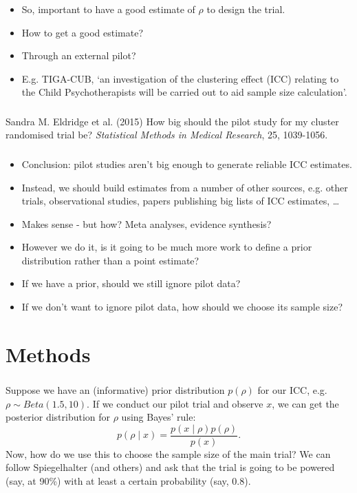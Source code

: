 \documentclass{beamer}
\begin{document}
\begin{frame}
\frametitle{}
\begin{itemize}
\item So, important to have a good estimate of $\rho$ to design the trial.
\item How to get a good estimate?
\item Through an external pilot?
\item E.g. TIGA-CUB, `an investigation of the clustering effect (ICC) relating to the Child Psychotherapists will be carried out to aid sample size calculation'.
\end{itemize}
\end{frame}

\begin{frame}
\frametitle{}
\begin{thebibliography}{99}
 Sandra M. Eldridge et al. (2015) 
\newblock How big should the pilot study for my cluster randomised trial be?
\newblock \emph{Statistical Methods in Medical Research}, 25, 1039-1056.
\end{thebibliography}
\end{frame}

\begin{frame}
\frametitle{}
\begin{itemize}
\item Conclusion: pilot studies aren't big enough to generate reliable ICC estimates.
\item Instead, we should build estimates from a number of other sources, e.g. other trials, observational studies, papers publishing big lists of ICC estimates, \ldots
\item Makes sense - but how? Meta analyses, evidence synthesis?
\item However we do it, is it going to be much more work to define a prior distribution rather than a point estimate?
\item If we have a prior, should we still ignore pilot data?
\item If we don't want to ignore pilot data, how should we choose its sample size?
\end{itemize}
\end{frame}

\section{Methods}

\begin{frame}
\frametitle{}
Suppose we have an (informative) prior distribution $p(\rho)$ for our ICC, e.g. $\rho \sim Beta(1.5, 10)$. 
\pause
If we conduct our pilot trial and observe $x$, we can get the posterior distribution for $\rho$ using Bayes' rule:
\begin{equation}
p(\rho \mid x) = \frac{p(x \mid \rho) p(\rho)}{p(x)}.
\end{equation}
Now, how do we use this to choose the sample size of the main trial? We can follow Spiegelhalter (and others) and ask that the trial is going to be powered (say, at 90\%) with at least a certain probability (say, 0.8).
\end{frame}
\end{document}
